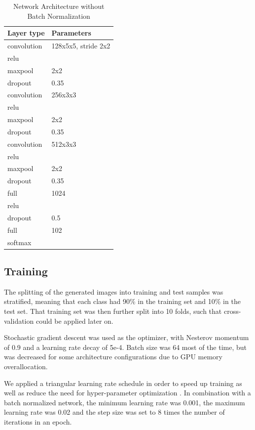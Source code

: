 \documentclass[a4paper, 11pt]{article}
\begin{document}
\begin{table}[H]
	\begin{center}
		\begin{tabularx}{.5\linewidth}{|X|l|}
			\hline \textbf{Layer type} & \textbf{Parameters} \\ 
			\hline convolution & 128x5x5, stride 2x2 \\ 
			\hline relu &\\
			\hline maxpool &  2x2\\ 
			\hline dropout & 0.35 \\
			\hline convolution & 256x3x3 \\ 
			\hline relu &\\
			\hline maxpool &  2x2\\ 
			\hline dropout & 0.35 \\
			\hline convolution & 512x3x3 \\ 
			\hline relu &\\
			\hline maxpool &  2x2\\ 
			\hline dropout & 0.35 \\
			\hline full &  1024 \\ 
			\hline relu &\\
			\hline dropout & 0.5 \\
			\hline full &  102 \\
			\hline softmax & \\
			\hline
		\end{tabularx}
	\end{center}
	\caption{Network Architecture without Batch Normalization}
	\label{tab:no-bn-arch}
\end{table}



\subsection{Training}
The splitting of the generated images into training and test samples was stratified, meaning that each class had 90\% in the training set and 10\% in the test set.
That training set was then further split into 10 folds, such that cross-validation could be applied later on.

Stochastic gradient descent was used as the optimizer, with Nesterov momentum of 0.9 and a learning rate decay of 5e-4.
Batch size was 64 most of the time, but was decreased for some architecture configurations due to GPU memory overallocation.

We applied a triangular learning rate schedule in order to speed up training as well as reduce the need for hyper-parameter optimization \cite{Smith2015}.
In combination with a batch normalized network, the minimum learning rate was 0.001, the maximum learning rate was 0.02 and the step size was set to 8 times the number of iterations in an epoch.
\end{document}
